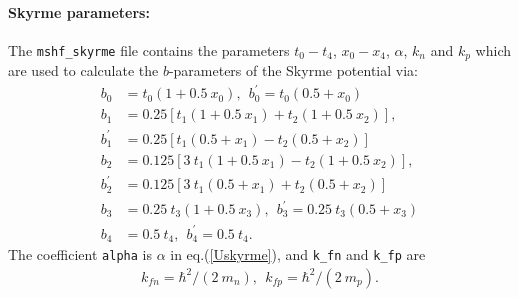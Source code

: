 \documentclass[4p]{elsarticle}
\begin{document}
\paragraph{Skyrme parameters:} The \texttt{mshf\_skyrme} file contains the parameters $t_0 - t_4$, $x_0 - x_4$, $\alpha$, $k_{n}$ and $k_p$ which are used to calculate the $b$-parameters of the Skyrme potential via:
\begin{align}
b_0 &= t_0 \left( 1 + 0.5 \: x_0 \right), \:\: b^{\prime}_0 = t_0 \left( 0.5 + x_0 \right)\\
b_1 &= 0.25 \left[ t_1 \left( 1 + 0.5 \: x_1 \right) + t_2 \left( 1 + 0.5 \: x_2 \right) \right], \\
b^{\prime}_1 &= 0.25 \left[ t_1 \left( 0.5 + x_1 \right) - t_2 \left( 0.5 + x_2 \right) \right] \\ 
b_2 &= 0.125 \left[ 3\: t_1 \left( 1 + 0.5 \: x_1 \right) - t_2 \left( 1 + 0.5 \: x_2 \right) \right],\\ 
b^{\prime}_2 &= 0.125 \left[ 3 \: t_1 \left( 0.5 + x_1 \right) + t_2 \left( 0.5 + x_2 \right) \right] \\
b_3 &= 0.25 \: t_3 \left( 1 + 0.5 \: x_3 \right), \:\: b^{\prime}_3 = 0.25 \: t_3 \left( 0.5 + x_3 \right)\\
b_4 &= 0.5 \: t_4, \:\: b^{\prime}_4 = 0.5 \: t_4. 
\end{align}
The coefficient \texttt{alpha} is $\alpha$ in eq.(\ref{Uskyrme}), and \texttt{k\_fn} and \texttt{k\_fp} are
\begin{align}
k_{fn} = \hbar^2 / (2 \: m_n), \:\: k_{fp} = \hbar^2 / (2 \: m_p).
\end{align}
\end{document}
